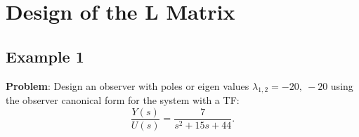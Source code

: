 
\ifslidesonly
\begin{slide}
   
\end{slide}
\fi



\ifslidesonly
\begin{slide}
   
\end{slide}
\fi
 

\ifslidesonly
\begin{slide}
   
\end{slide}
\fi


\section*{Design of the $\mathbf{L}$ Matrix} %
\label{sec:design_of_the_l_matrix}


\ifslidesonly
\begin{slide}
   
\end{slide}
\fi


\ifslidesonly
\begin{slide}
   
\end{slide}
\fi


\ifslidesonly
\begin{slide}
   
\end{slide}
\fi


\subsection*{Example 1} %
\label{sub:example_1}

\textbf{Problem}: Design an observer with poles or eigen values $\lambda_{1,2} = -20,\ -20$ using the observer canonical form for the system with a TF:
\[
\frac{Y(s)}{U(s)}=\frac{7}{s^2+15s+44}.
\]
 
